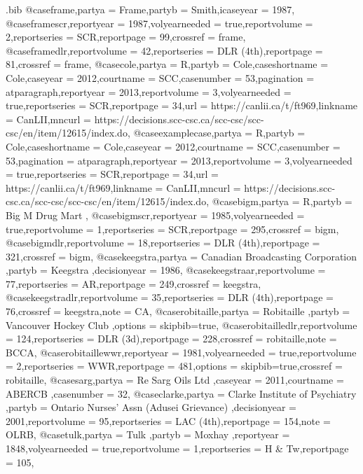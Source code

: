 \begin{filecontents*}[overwrite]{\jobname.bib}
@case{frame,partya = {Frame},partyb = {Smith},icaseyear = {1987},}
@case{framescr,reportyear = {1987},volyearneeded = {true},reportvolume = {2},reportseries = {SCR},reportpage = {99},crossref = {frame},}
@case{framedlr,reportvolume = {42},reportseries = {DLR (4th)},reportpage = {81},crossref = {frame},}
@case{cole,partya =  {R},partyb =  {Cole},caseshortname =  {Cole},caseyear =  {2012},courtname =  {SCC},casenumber =  {53},pagination =  {atparagraph},reportyear =  {2013},reportvolume =  {3},volyearneeded =  {true},reportseries =  {SCR},reportpage =  {34},url =  {https://canlii.ca/t/ft969},linkname =  {CanLII},mncurl =  {https://decisions.scc-csc.ca/scc-csc/scc-csc/en/item/12615/index.do},}
@case{examplecase,partya =  {R},partyb =  {Cole},caseshortname =  {Cole},caseyear =  {2012},courtname =  {SCC},casenumber =  {53},pagination =  {atparagraph},reportyear =  {2013},reportvolume =  {3},volyearneeded =  {true},reportseries =  {SCR},reportpage =  {34},url =  {https://canlii.ca/t/ft969},linkname =  {CanLII},mncurl =  {https://decisions.scc-csc.ca/scc-csc/scc-csc/en/item/12615/index.do},}
@case{bigm,partya = {R},partyb = {Big M Drug Mart },}
@case{bigmscr,reportyear = {1985},volyearneeded = {true},reportvolume = {1},reportseries = {SCR},reportpage = {295},crossref = {bigm},}
@case{bigmdlr,reportvolume = {18},reportseries = {DLR (4th)},reportpage = {321},crossref = {bigm},}
@case{keegstra,partya = {Canadian Broadcasting Corporation },partyb = {Keegstra },decisionyear = {1986},}
@case{keegstraar,reportvolume = {77},reportseries = {AR},reportpage = {249},crossref = {keegstra},}
@case{keegstradlr,reportvolume = {35},reportseries = {DLR (4th)},reportpage = {76},crossref = {keegstra},note = {CA},}
@case{robitaille,partya = {Robitaille },partyb = {Vancouver Hockey Club },options = {skipbib=true},}
@case{robitailledlr,reportvolume = {124},reportseries = {DLR (3d)},reportpage = {228},crossref = {robitaille},note = {BCCA},}
@case{robitaillewwr,reportyear = {1981},volyearneeded = {true},reportvolume = {2},reportseries = {WWR},reportpage = {481},options = {skipbib=true},crossref = {robitaille},}
@case{sarg,partya = {Re Sarg Oils Ltd },caseyear = {2011},courtname = {ABERCB },casenumber = {32},}
@case{clarke,partya = {Clarke Institute of Psychiatry },partyb = {Ontario Nurses' Assn (Adusei Grievance) },decisionyear = {2001},reportvolume = {95},reportseries = {LAC (4th)},reportpage = {154},note = {OLRB},}
@case{tulk,partya = {Tulk },partyb = {Moxhay },reportyear = {1848},volyearneeded = {true},reportvolume = {1},reportseries = {H \& Tw},reportpage = {105},}

\end{filecontents*}
